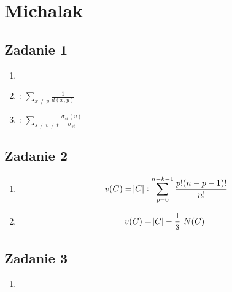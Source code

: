 \section{Michalak}

\subsection{Zadanie 1}
\begin{enumerate}
    \item
    \item
        :
        $\sum_{x\neq y}{\frac{1}{d(x,y)}}$
    \item
        :
        $\sum_{s\neq v \neq t} \frac{\sigma_{st}(v)}{\sigma_{st}}$

\end{enumerate}

\subsection{Zadanie 2}
\begin{enumerate}
    \item
        $$
        v(C) = \abs{C}:
        \sum^{n - k - 1}_{p = 0} \frac{p! (n - p - 1)!}{n!}
        $$
    \item
        $$
        v(C) = \abs{C} - \frac{1}{3} \abs{N(C)}
        $$


\end{enumerate}

\subsection{Zadanie 3}
\begin{enumerate}
    \item
\end{enumerate}
